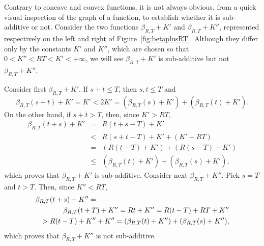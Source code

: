 Contrary to concave and convex functions, it is not always
obvious, from a quick visual inspection of the graph of a
function, to establish whether it is sub-additive or not. Consider
the two functions $ \beta_{R,T} + K'$ and $\beta_{R,T} + K''$,
represented respectively on the left and right of
Figure~\ref{fig:betaplusRT}. Although they differ only by the
constants $K'$ and $K''$, which are chosen so that $0 < K'' < RT <
K' < +\infty$, we will see $\beta_{R,T} + K'$ is sub-additive but
not $\beta_{R,T} + K''$.
\begin{figure}[!htbp]
\end{figure}
Consider first  $\beta_{R,T} + K'$.
If $s +t \leq T$, then $s,t \leq T$ and
$$\beta_{R,T}(s+t) + K' = K' < 2K' = (\beta_{R,T}(s) + K') + (\beta_{R,T}(t) + K'). $$
On the other hand, if $s +t > T$, then,  since $K' > RT$,
\begin{eqnarray*}
\beta_{R,T}(t+s) + K' & = & R(t+s-T) + K' \\
              & < & R(s+t-T) + K' + (K'-RT)  \\
              &  = & (R(t-T) + K') + (R(s-T) + K') \\
              & \leq & (\beta_{R,T}(t) + K') + (\beta_{R,T}(s) + K'),
\end{eqnarray*}
which proves that $\beta_{R,T} + K'$ is sub-additive.
Consider next $\beta_{R,T} + K''$. Pick $s = T$ and $t > T$. Then, since $K'' < RT$,
\begin{eqnarray*}
\lefteqn{\beta_{R,T}(t+s) + K''  =}\\
 & & \beta_{R,T}(t+T) + K'' = Rt + K'' = R(t-T) + RT + K'' \\
 &  & >  R(t-T) + K'' + K''
                = (\beta_{R,T}(t) + K'') + (\beta_{R,T}(s) + K''),
\end{eqnarray*}
which proves that $\beta_{R,T} + K''$ is not sub-additive.

